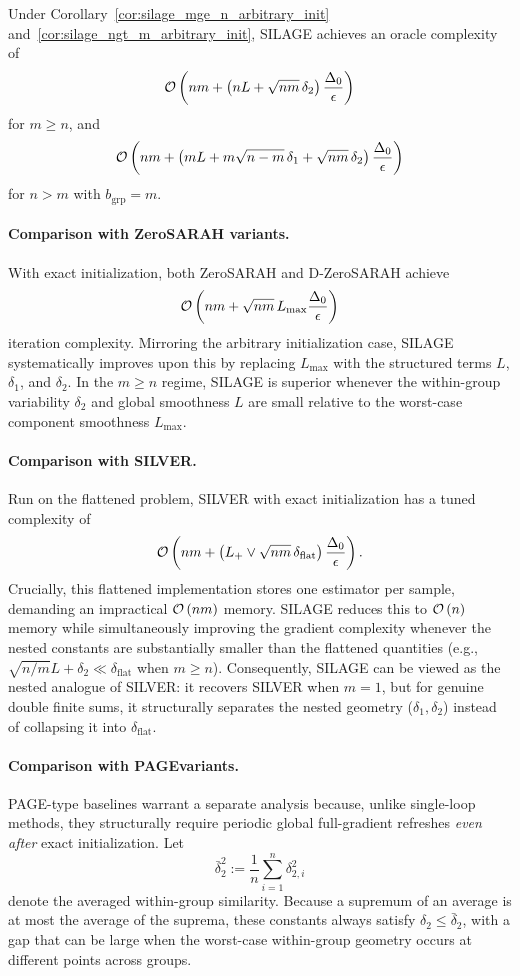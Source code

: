 \documentclass{article}
\newcommand{\cO}{{\cal O}}
\newcommand{\eqdef}{:=}
\newcommand{\rb}[1]{\left(#1\right)}
\theoremstyle{plain}
\newcommand{\algname}[1]{{\sf\scalefont{0.88}\color{mydarkgreen}#1}\xspace}
\newcommand{\algno}{{\sf\scalefont{0.88}\color{mydarkgreen}SILAGE}\xspace}
\def\algname#1{#1}%
\begin{document}
Under Corollary~\ref{cor:silage_mge_n_arbitrary_init} and~\ref{cor:silage_ngt_m_arbitrary_init}, \algno achieves an oracle complexity of \[\cO\rb{nm+\rb{nL+\sqrt{nm}\,\delta_2}\frac{\Delta_0}{\epsilon}}\] for $m\ge n$, and \[\cO\rb{nm+\rb{mL+m\sqrt{n-m}\,\delta_1+\sqrt{nm}\,\delta_2}\frac{\Delta_0}{\epsilon}}\] for $n>m$ with $b_{\mathrm{grp}}=m$.

\paragraph{Comparison with \algname{ZeroSARAH} variants.}
With exact initialization, both \algname{ZeroSARAH} \citep{li2021zerosarah}  and \algname{D-ZeroSARAH} \citep{li2021zerosarah} achieve  \[\cO\rb{nm+\sqrt{nm}\,L_{\max}\frac{\Delta_0}{\epsilon}}\] iteration complexity. Mirroring the arbitrary initialization case, \algno systematically improves upon this by replacing $L_{\max}$ with the structured terms $L$, $\delta_1$, and $\delta_2$. In the $m\ge n$ regime, \algno is superior whenever the within-group variability $\delta_2$ and global smoothness $L$ are small relative to the worst-case component smoothness $L_{\max}$.

\paragraph{Comparison with \algname{SILVER}.}
Run on the flattened problem, \algname{SILVER} \citep{oko24} with exact initialization has a tuned complexity of \[\cO\rb{nm+\rb{L_+\vee \sqrt{nm}\,\delta_{\mathrm{flat}}}\frac{\Delta_0}{\epsilon}}.\] Crucially, this flattened implementation stores one estimator per sample, demanding an impractical $\cO\rb{nm}$ memory. \algno reduces this to $\cO\rb{n}$ memory while simultaneously improving the gradient complexity whenever the nested constants are substantially smaller than the flattened quantities (e.g., $\sqrt{n/m}L+\delta_2 \ll \delta_{\mathrm{flat}}$ when $m \ge n$). Consequently, \algno can be viewed as the nested analogue of \algname{SILVER}: it recovers \algname{SILVER} when $m=1$, but for genuine double finite sums, it structurally separates the nested geometry ($\delta_1, \delta_2$) instead of collapsing it into $\delta_{\mathrm{flat}}$.

\paragraph{\normalcolor Comparison with \algname{PAGE}\normalcolor variants.}
{\algname{PAGE}}-type baselines warrant a separate analysis because, unlike single-loop methods, they structurally require periodic global full-gradient refreshes \emph{even after} exact initialization. Let \[\bar{\delta}_2^2\eqdef \frac{1}{n}\sum_{i=1}^n\delta_{2,i}^2\] denote the averaged within-group similarity. Because a supremum of an average is at most the average of the suprema, these constants always satisfy $\delta_2 \le \bar{\delta}_2$, with a gap that can be large when the worst-case within-group geometry occurs at different points across groups.
\end{document}
